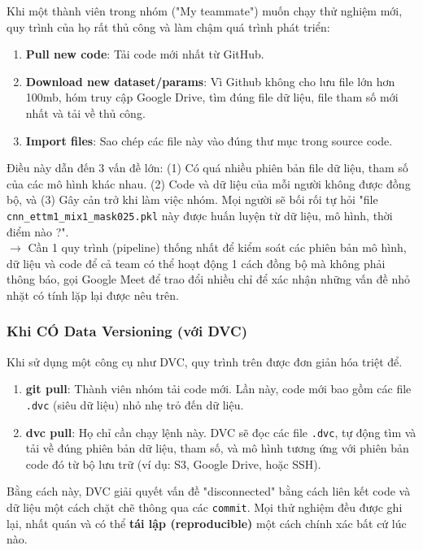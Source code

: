 \documentclass[11pt]{article}
\begin{document}
Khi một thành viên trong nhóm ("My teammate") muốn chạy thử nghiệm mới, quy trình của họ rất thủ công và làm chậm quá trình phát triển:
\begin{enumerate}
    \item \textbf{Pull new code}: Tải code mới nhất từ GitHub.
    \item \textbf{Download new dataset/params}: Vì Github không cho lưu file lớn hơn 100mb, hóm truy cập Google Drive, tìm đúng file dữ liệu, file tham số mới nhất và tải về thủ công.
    \item \textbf{Import files}: Sao chép các file này vào đúng thư mục trong source code.
\end{enumerate}
Điều này dẫn đến 3 vấn đề lớn: (1) Có quá nhiều phiên bản file dữ liệu, tham số của các mô hình khác nhau. (2) Code và dữ liệu của mỗi người không được đồng bộ, và (3) Gây cản trở khi làm việc nhóm. Mọi người sẽ bối rối tự hỏi "file \texttt{cnn\_ettm1\_mix1\_mask025.pkl} này được huấn luyện từ dữ liệu, mô hình, thời điểm nào ?". \\

\noindent $\longrightarrow$ Cần 1 quy trình (pipeline) thống nhất để kiểm soát các phiên bản mô hình, dữ liệu và code để cả team có thể hoạt động 1 cách đồng bộ mà không phải thông báo, gọi Google Meet để trao đổi nhiều chỉ để xác nhận những vấn đề nhỏ nhặt có tính lặp lại được nêu trên.


\subsubsection{Khi CÓ Data Versioning (với DVC)}
Khi sử dụng một công cụ như DVC, quy trình trên được đơn giản hóa triệt để.
\begin{enumerate}
    \item \textbf{git pull}: Thành viên nhóm tải code mới. Lần này, code mới bao gồm các file \texttt{.dvc} (siêu dữ liệu) nhỏ nhẹ trỏ đến dữ liệu.
    \item \textbf{dvc pull}: Họ chỉ cần chạy lệnh này. DVC sẽ đọc các file \texttt{.dvc}, tự động tìm và tải về đúng phiên bản dữ liệu, tham số, và mô hình tương ứng với phiên bản code đó từ bộ lưu trữ (ví dụ: S3, Google Drive, hoặc SSH).
\end{enumerate}
Bằng cách này, DVC giải quyết vấn đề "disconnected" bằng cách liên kết code và dữ liệu một cách chặt chẽ thông qua các \texttt{commit}. Mọi thử nghiệm đều được ghi lại, nhất quán và có thể \textbf{tái lập (reproducible)} một cách chính xác bất cứ lúc nào.
\end{document}
